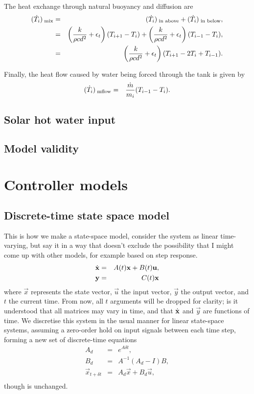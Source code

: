 The heat exchange through natural buoyancy and diffusion are
\begin{eqnarray}
	(\dot{T}_i)_{\;\text{mix}} &=& (\dot{T}_i)_{\;\text{in above}} + (\dot{T}_i)_{\;\text{in below}}, \nonumber\\
	           &=& \left(\frac{k}{\rho c d^2} + \epsilon_t\right)(T_{i+1} - T_i)
				    + \left(\frac{k}{\rho c d^2} + \epsilon_t\right)(T_{i-1} - T_i), \nonumber\\
				  &=& \left(\frac{k}{\rho c d^2} + \epsilon_t\right)(T_{i+1} - 2 T_i + T_{i-1}).
\end{eqnarray}

Finally, the heat flow caused by water being forced through the tank is given by
\begin{eqnarray}
	(\dot{T}_i)_{\;\text{mflow}} &=& \frac{\dot{m}}{m_i} (T_{i-1} - T_i).
\end{eqnarray}

\subsection{Solar hot water input}

\subsection{Model validity}

\section{Controller models}

\subsection{Discrete-time state space model}

This is how we make a state-space model, consider the system as linear time-varying, but say it in a way that doesn't exclude the possibility that I might come up with other models, for example based on step response.
\begin{eqnarray}
	\label{eq:continuous-xdot}
	\dot{\mathbf{x}} &=& A(t) \mathbf{x} + B(t) \mathbf{u}, \\
	\label{eq:continuous-y}
	\mathbf{y} &=& C(t) \mathbf{x}
\end{eqnarray}
where $\vec{x}$ represents the state vector, $\vec{u}$ the input vector, $\vec{y}$ the output vector, and $t$ the current time.
From now, all $t$ arguments will be dropped for clarity; is it understood that all matrices may vary in time, and that $\dot{\mathbf{x}}$ and $\vec{y}$ are functions of time.
We discretise this system in the usual manner for linear state-space systems, assuming a zero-order hold on input signals between each time step, forming a new set of discrete-time equations
\begin{eqnarray}
	\label{eq:discretise-A}
	A_d &=& e^{A \delta t}, \\
	\label{eq:discretise-B}
	B_d &=& A^{-1} (A_d - I) B, \\
	\label{eq:discrete-xdot}
	\vec{x}_{t + \delta t} &=& A_d \vec{x} + B_d \vec{u}, \\
\end{eqnarray}
though  is unchanged.

